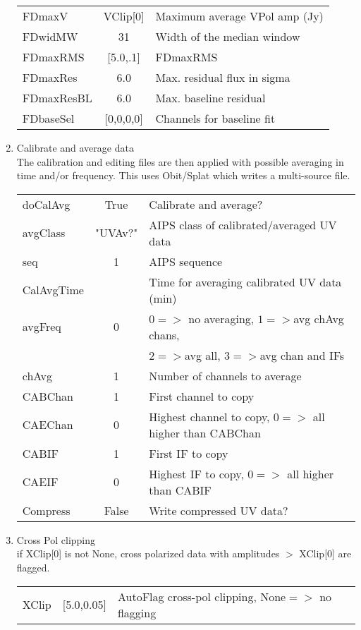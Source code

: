 \documentclass[11pt]{article}
\begin{document}
\begin{enumerate}
\begin{center}
\begin{tabular}{|l|c|l|}
FDmaxV    & VClip[0] &  Maximum average VPol amp (Jy)\\
FDwidMW   & 31 & Width of the median window \\
FDmaxRMS  & [5.0,.1] &  FDmaxRMS\\
FDmaxRes  & 6.0  &  Max. residual flux in sigma\\
FDmaxResBL & 6.0 &  Max. baseline residual\\
FDbaseSel  & [0,0,0,0] & Channels for baseline fit \\
\hline
\end{tabular}
\end{center}
%
\item Calibrate and average data\\
The calibration and editing files are then applied with possible
averaging in time and/or frequency.
This uses Obit/Splat which writes a multi-source file.
\begin{center}
\begin{tabular}{|l|c|l|}
\hline
doCalAvg  & True &  Calibrate and average?\\
avgClass  & "UVAv?" & AIPS class of calibrated/averaged UV data \\
seq  & 1 &  AIPS sequence \\
CalAvgTime  &  &  Time for averaging calibrated UV data (min) \\
avgFreq  & 0 &  $0=>$ no averaging, $1=>$avg chAvg chans,\\
 & &$2=>$avg all, $3=>$avg chan and IFs\\
chAvg  & 1 & Number of channels to average \\
CABChan& 1 &  First channel to copy \\
CAEChan& 0 &  Highest channel to copy, $0=>$ all higher than CABChan\\
CABIF  & 1 &  First IF to copy \\
CAEIF  & 0 &  Highest IF to copy, $0=>$ all higher than CABIF\\
Compress & False &  Write compressed UV data?\\
\hline
\end{tabular}
\end{center}
%
\item Cross Pol clipping\\
if XClip[0] is not None,  cross polarized data with amplitudes $>$ XClip[0] are flagged.
\begin{center}
\begin{tabular}{|l|c|l|}
\hline
XClip  & [5.0,0.05] & AutoFlag cross-pol clipping, None$=>$ no flagging \\

\end{tabular}
\end{center}
\end{enumerate}
\end{document}
